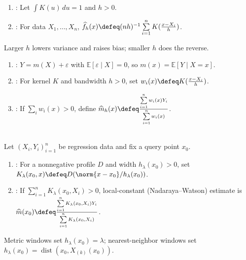 \begin{definition} \label{def:kernel-density-estimator} 
\begin{enumerate}[label=(\roman*)]
\setlength{\itemsep}{0pt}
\item {}: Let $\int K(u)\,du=1$ and $h>0$.
\item {}: For data $X_1,\ldots,X_n$, $\widehat{f}_h(x)\defeq(nh)^{-1}\sum\limits_{i=1}^nK(\frac{x-X_i}{h})$.
\end{enumerate}
Larger $h$ lowers variance and raises bias; smaller $h$ does the reverse.
\end{definition}

\begin{definition} \label{def:nonparametric-regression-smoothing} 
\begin{enumerate}[label=(\roman*)]
\setlength{\itemsep}{0pt}
\item {}: $Y=m(X)+\varepsilon$ with $\mathbb{E}[\varepsilon\mid X]=0$, so $m(x)=\mathbb{E}[Y\mid X=x]$.
\item {}: For kernel $K$ and bandwidth $h>0$, set $w_i(x)\defeq K(\frac{x-X_i}{h})$.
\item {}: If $\sum\limits_iw_i(x)>0$, define $\widehat{m}_h(x)\defeq \frac{\sum\limits_{i=1}^nw_i(x)Y_i}{\sum\limits_{i=1}^nw_i(x)}$.
\end{enumerate}
\end{definition}

\begin{definition} \label{def:nadaraya-watson-kernel-smoother} \\
Let $(X_i,Y_i)_{i=1}^n$ be regression data and fix a query point $x_0$.
\begin{enumerate}[label=(\roman*)]
\setlength{\itemsep}{0pt}
\item {}: For a nonnegative profile $D$ and width $h_\lambda(x_0)>0$, set $K_\lambda(x_0,x)\defeq D(\norm{x-x_0}/h_\lambda(x_0))$.
\item {}: If $\sum\limits_{i=1}^nK_\lambda(x_0,X_i)>0$, local-constant (Nadaraya--Watson) estimate is $\widehat{m}(x_0)\defeq\frac{\sum\limits_{i=1}^nK_\lambda(x_0,X_i)Y_i}{\sum\limits_{i=1}^nK_\lambda(x_0,X_i)}$.
\end{enumerate}
Metric windows set $h_\lambda(x_0)=\lambda$; nearest-neighbor windows set $h_\lambda(x_0)=\operatorname{dist}(x_0,X_{(k)}(x_0))$.
\end{definition}

